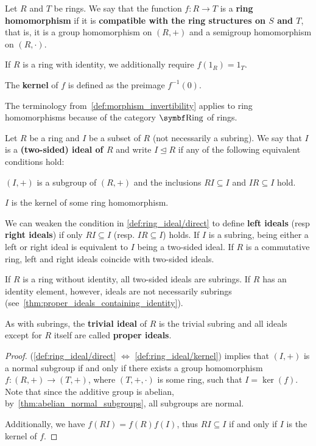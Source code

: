 \begin{definition}\label{def:ring_homomorphism}
  Let \( R \) and \( T \) be rings. We say that the function \( f: R \to T \) is a \textbf{ring homomorphism} if it is \textbf{compatible with the ring structures on \( S \) and \( T \)}, that is, it is a group homomorphism on \( (R, +) \) and a semigroup homomorphism on \( (R, \cdot) \).

  If \( R \) is a ring with identity, we additionally require \( f(1_R) = 1_T \).

  The \textbf{kernel} of \( f \) is defined as the preimage \( f^{-1}(0) \).

  The terminology from~\cref{def:morphism_invertibility} applies to ring homomorphisms because of the category \( \Bold{Ring} \) of rings.
\end{definition}

\begin{definition}\label{def:ring_ideal}
  Let \( R \) be a ring and \( I \) be a subset of \( R \) (not necessarily a subring). We say that \( I \) is a \textbf{(two-sided) ideal of \( R \)} and write \( I \unlhd R \) if any of the following equivalent conditions hold:
  \begin{defenum}
    \item\label{def:ring_ideal/direct} \( (I, +) \) is a subgroup of \( (R, +) \) and the inclusions \( RI \subseteq I \) and \( IR \subseteq I \) hold.
    \item\label{def:ring_ideal/kernel} \( I \) is the kernel of some ring homomorphism.
  \end{defenum}

  We can weaken the condition in \ref{def:ring_ideal/direct} to define \textbf{left ideals} (resp \textbf{right ideals}) if only \( RI \subseteq I \) (resp. \( IR \subseteq I \)) holds. If \( I \) is a subring, being either a left or right ideal is equivalent to \( I \) being a two-sided ideal. If \( R \) is a commutative ring, left and right ideals coincide with two-sided ideals.

  If \( R \) is a ring without identity, all two-sided ideals are subrings. If \( R \) has an identity element, however, ideals are not necessarily subrings (see~\cref{thm:proper_ideals_containing_identity}).

  As with subrings, the \textbf{trivial ideal} of \( R \) is the trivial subring and all ideals except for \( R \) itself are called \textbf{proper ideals}.
\end{definition}
\begin{proof}
  (\ref{def:ring_ideal/direct} \( \iff \) \ref{def:ring_ideal/kernel})  implies that \( (I, +) \) is a normal subgroup if and only if there exists a group homomorphism \( f: (R, +) \to (T, +) \), where \( (T, +, \cdot) \) is some ring, such that \( I = \ker(f) \). Note that since the additive group is abelian, by~\cref{thm:abelian_normal_subgroups}, all subgroups are normal.

  Additionally, we have \( f(RI) = f(R)f(I) \), thus \( RI \subseteq I \) if and only if \( I \) is the kernel of \( f \).
\end{proof}

